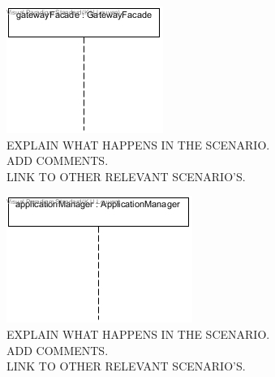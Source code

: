     \begin{figure}[!htp]
    	\centering
    	\includegraphics[width=\textwidth]{images/sequence-Av1-UC15}
    	\caption[Detection and handling of communication channel failure]{EXPLAIN WHAT HAPPENS IN THE SCENARIO. \\ ADD COMMENTS. \\ LINK TO OTHER RELEVANT SCENARIO'S. }\label{fig:seq_scenario7}
    \end{figure}

    \begin{figure}[h]
    	\centering
    	\includegraphics[width=\textwidth]{images/sequence-U1-UC22}
    	\caption[Upgrading an application]{EXPLAIN WHAT HAPPENS IN THE SCENARIO. \\ ADD COMMENTS. \\ LINK TO OTHER RELEVANT SCENARIO'S. }\label{fig:seq_scenario8}
    \end{figure}

